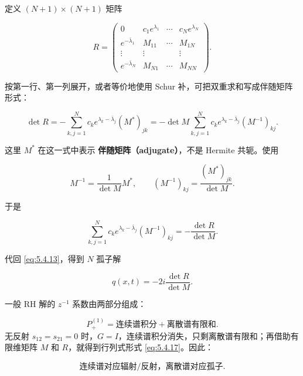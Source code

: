 \documentclass[
    lang=cn,
    scheme=chinese,
    mode=simple,
    device=normal,
    color=blue,
    math=cm,
    thmcnt=section,
    12pt,
    nowatermark
]{elegantbook}
\begin{document}
定义 $(N+1)\times(N+1)$ 矩阵

\begin{equation}
    R=
    \begin{pmatrix}
        0                  & c_1e^{\lambda_1} & \cdots & c_Ne^{\lambda_N} \\
        e^{-\bar\lambda_1} & M_{11}           & \cdots & M_{1N}           \\
        \vdots             & \vdots           &        & \vdots           \\
        e^{-\bar\lambda_N} & M_{N1}           & \cdots & M_{NN}
    \end{pmatrix}.
    \tag{5.4.14}
    \label{eq:5.4.14}
\end{equation}

按第一行、第一列展开，或者等价地使用 Schur 补，可把双重求和写成伴随矩阵形式：

\begin{equation}
    \det R
    =
    -\sum\limits_{k,j=1}^{N}
    c_ke^{\lambda_k-\bar\lambda_j}(M^*)_{jk}
    =
    -\det M
    \sum\limits_{k,j=1}^{N}
    c_ke^{\lambda_k-\bar\lambda_j}(M^{-1})_{kj}.
    \tag{5.4.15}
    \label{eq:5.4.15}
\end{equation}

这里 $M^*$ 在这一式中表示 \textbf{伴随矩阵（adjugate）}，不是 Hermite 共轭。使用

\[
    M^{-1}
    =
    \dfrac{1}{\det M}M^*,
    \qquad
    (M^{-1})_{kj}
    =
    \dfrac{(M^*)_{jk}}{\det M}.
\]

于是

\begin{equation}
    \sum\limits_{k,j=1}^{N}
    c_ke^{\lambda_k-\bar\lambda_j}(M^{-1})_{kj}
    =
    -\dfrac{\det R}{\det M}.
    \tag{5.4.16}
    \label{eq:5.4.16}
\end{equation}

代回 \eqref{eq:5.4.13}，得到 $N$ 孤子解

\begin{equation}
    \boxed{
        q(x,t)
        =
        -2i\dfrac{\det R}{\det M}.
    }
    \tag{5.4.17}
    \label{eq:5.4.17}
\end{equation}

\begin{callout}[4.2 节的核心思路]
    一般 RH 解的 $z^{-1}$ 系数由两部分组成：

    \[
        P_+^{(1)}
        =
        \text{连续谱积分}
        +
        \text{离散谱有限和}.
    \]
    无反射 $s_{12}=s_{21}=0$ 时，$G=I$，连续谱积分消失，只剩离散谱有限和；再借助有限维矩阵 $M$ 和 $R$，就得到行列式形式 \eqref{eq:5.4.17}。因此：

    \[
        \boxed{\text{连续谱对应辐射/反射，离散谱对应孤子}.}
    \]

\end{callout}
\end{document}
